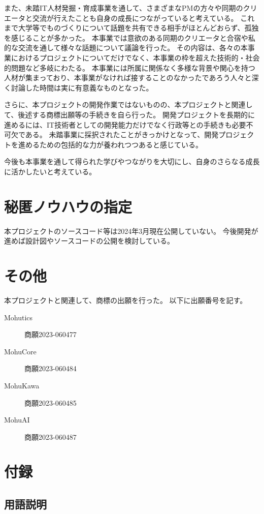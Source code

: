 \documentclass[uplatex,a4paper,12pt]{jsarticle}
\begin{document}
また、未踏IT人材発掘・育成事業を通して、さまざまなPMの方々や同期のクリエータと交流が行えたことも自身の成長につながっていると考えている。
これまで大学等でものづくりについて話題を共有できる相手がほとんどおらず、孤独を感じることが多かった。
本事業では意欲のある同期のクリエータと合宿や私的な交流を通して様々な話題について議論を行った。
その内容は、各々の本事業におけるプロジェクトについてだけでなく、本事業の枠を超えた技術的・社会的問題など多岐にわたる。
本事業には所属に関係なく多様な背景や関心を持つ人材が集まっており、本事業がなければ接することのなかったであろう人々と深く討論した時間は実に有意義なものとなった。

さらに、本プロジェクトの開発作業ではないものの、本プロジェクトと関連して、後述する商標出願等の手続きを自ら行った。
開発プロジェクトを長期的に進めるには、IT技術者としての開発能力だけでなく行政等との手続きも必要不可欠である。
未踏事業に採択されたことがきっかけとなって、開発プロジェクトを進めるための包括的な力が養われつつあると感じている。

今後も本事業を通して得られた学びやつながりを大切にし、自身のさらなる成長に活かしたいと考えている。


\section{秘匿ノウハウの指定}
本プロジェクトのソースコード等は2024年3月現在公開していない。
今後開発が進めば設計図やソースコードの公開を検討している。

\section{その他}
本プロジェクトと関連して、商標の出願を行った。
以下に出願番号を記す。
\begin{description}
  \item[Mohutics] 商願2023-060477
  \item[MohuCore] 商願2023-060484
  \item[MohuKawa] 商願2023-060485
  \item[MohuAI] 商願2023-060487
\end{description}

\section{付録}

\subsection{用語説明}
\end{document}
